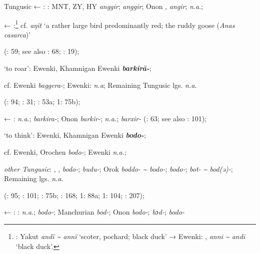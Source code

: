 \documentclass[output=paper,colorlinks,citecolor=brown]{langscibook}
\begin{document}
    Tungusic ← : : MNT, ZY, HY \textit{anggir};  \textit{anggir}; Onon ,  \textit{angir};  \textit{n.a}.;

     ← :\footnote{: Yakut \textit{andï {\textasciitilde} annï} ‘scoter, pochard; black duck’ →  Ewenki: ,  \textit{anni {\textasciitilde} andi} ‘black duck’.} cf.  \textit{aŋït} ‘a rather large bird predominantly red; the ruddy goose (\textit{Anas casarca})’
    
    (\citealt{Khabtagaeva2017}: 59; see also \citealt{Doerfer1985}: 68; \citealt{Rozycki1994}: 19); 

    \ex ‘to roar’:  Ewenki, Khamnigan Ewenki \textbf{\textit{barkirā-}};

    cf.  Ewenki \textit{baggera-};  Ewenki: \textit{n.a}; Remaining Tungusic lgs. \textit{n.a}.
    
    (\citealt{Castrén1856}: 94; \citealt{Janhunen1991}: 31; \citealt{Dorji1998}: 53a; \citealt{Cincius1975B} 1: 75b); 

    ← :  \textit{n.a}.;  \textit{barkira-}; Onon  \textit{barkir-};  \textit{n.a.};  \textit{barxir-} (\citealt{Khabtagaeva2017}: 63; see also \citealt{Doerfer1985}: 101);

    \ex ‘to think’:  Ewenki, Khamnigan Ewenki \textbf{\textit{bodo-}};

    cf.  Ewenki, Orochen \textit{bodo-};  Ewenki \textit{n.a.};

    \textit{other Tungusic}: , ,  \textit{bodo-};  \textit{budu-}; Orok \textit{boddo- {\textasciitilde} bodo-};  \textit{bodo-};  \textit{bot- {\textasciitilde} bod(ǝ)-}; Remaining lgs. \textit{n.a}.
    
    (\citealt{Castrén1856}: 95; \citealt{Janhunen1991}: 101; \citealt{Dorji1998}: 75b; \citealt{Chaoke2014a}: 168; \citealt{Cincius1975B} 1: 88a; \citealt{Hauer1952} 1: 104; \citealt{Zikmundová2013a}: 207);

    ← : : \textit{n.a}.;  \textit{bodo-}; Manchurian  \textit{bod-}; Onon  \textit{bodo-};  \textit{bɔd-};  \textit{bodo-} 
    
\end{document}
